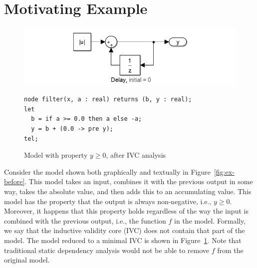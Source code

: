 \section{Motivating Example}
\label{sec:exmpl}

\begin{figure}[t]
\includegraphics[width=\columnwidth]{figs/simulink-ivc.png}
{\smaller
\begin{verbatim}
node filter(x, a : real) returns (b, y : real);
let
  b = if a >= 0.0 then a else -a;
  y = b + (0.0 -> pre y);
tel;
\end{verbatim}
}
\caption{Model with property $y \geq 0$, after IVC analysis}
\label{fig:ex-after}
\end{figure}

Consider the model shown both graphically and textually in
Figure~\ref{fig:ex-before}. This model takes an input, combines it
with the previous output in some way, takes the absolute value, and
then adds this to an accumulating value. This model has the property
that the output is always non-negative, i.e., $y \geq 0$. Moreover, it
happens that this property holds regardless of the way the input is
combined with the previous output, i.e., the function $f$ in the
model. Formally, we say that the inductive validity core (IVC) does
not contain that part of the model. The model reduced to a minimal IVC
is shown in Figure~\ref{fig:ex-after}. Note that traditional static
dependency analysis would not be able to remove $f$ from the original
model.


